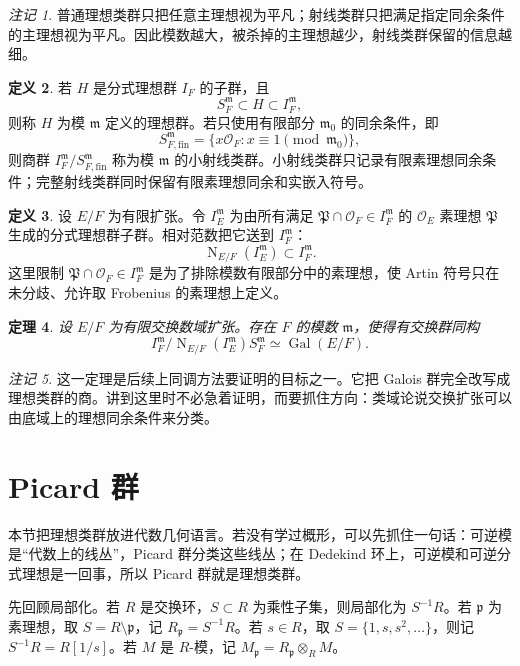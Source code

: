 \documentclass[11pt,a4paper,openany]{ctexbook}
\numberwithin{equation}{chapter}
\newcommand{\OF}{\mathcal{O}_F}
\newcommand{\Gal}{\operatorname{Gal}}
\newcommand{\Nm}{\operatorname{N}}
\theoremstyle{plain}
\newtheorem{theorem}{定理}[chapter]
\theoremstyle{definition}
\newtheorem{definition}[theorem]{定义}
\theoremstyle{remark}
\newtheorem{remark}[theorem]{注记}
\begin{document}
\begin{remark}
普通理想类群只把任意主理想视为平凡；射线类群只把满足指定同余条件的主理想视为平凡。因此模数越大，被杀掉的主理想越少，射线类群保留的信息越细。
\end{remark}

\begin{definition}
若 $H$ 是分式理想群 $I_F$ 的子群，且
\[
S_F^{\mathfrak m}\subset H\subset I_F^{\mathfrak m},
\]
则称 $H$ 为模 $\mathfrak m$ 定义的理想群。若只使用有限部分
$\mathfrak m_0$ 的同余条件，即
\[
S_{F,\mathrm{fin}}^{\mathfrak m}
=\{x\OF:x\equiv1\pmod{\mathfrak m_0}\},
\]
则商群 $I_F^{\mathfrak m}/S_{F,\mathrm{fin}}^{\mathfrak m}$ 称为模
$\mathfrak m$ 的小射线类群。小射线类群只记录有限素理想同余条件；完整射线类群同时保留有限素理想同余和实嵌入符号。
\end{definition}

\begin{definition}
设 $E/F$ 为有限扩张。令 $I_E^{\mathfrak m}$ 为由所有满足
$\mathfrak P\cap\OF\in I_F^{\mathfrak m}$ 的 $\mathcal O_E$ 素理想 $\mathfrak P$
生成的分式理想群子群。相对范数把它送到 $I_F^{\mathfrak m}$：
\[
\Nm_{E/F}(I_E^{\mathfrak m})\subset I_F^{\mathfrak m}.
\]
这里限制 $\mathfrak P\cap\OF\in I_F^{\mathfrak m}$ 是为了排除模数有限部分中的素理想，使 Artin 符号只在未分歧、允许取 Frobenius 的素理想上定义。
\end{definition}

\begin{theorem}
设 $E/F$ 为有限交换数域扩张。存在 $F$ 的模数 $\mathfrak m$，使得有交换群同构
\[
I_F^{\mathfrak m}/\Nm_{E/F}(I_E^{\mathfrak m})S_F^{\mathfrak m}
\simeq
\Gal(E/F).
\]
\end{theorem}

\begin{remark}
这一定理是后续上同调方法要证明的目标之一。它把 Galois 群完全改写成理想类群的商。讲到这里时不必急着证明，而要抓住方向：类域论说交换扩张可以由底域上的理想同余条件来分类。
\end{remark}

\section{Picard 群}

本节把理想类群放进代数几何语言。若没有学过概形，可以先抓住一句话：可逆模是“代数上的线丛”，Picard 群分类这些线丛；在 Dedekind 环上，可逆模和可逆分式理想是一回事，所以 Picard 群就是理想类群。

先回顾局部化。若 $R$ 是交换环，$S\subset R$ 为乘性子集，则局部化为
$S^{-1}R$。若 $\mathfrak p$ 为素理想，取 $S=R\setminus\mathfrak p$，记
$R_{\mathfrak p}=S^{-1}R$。若 $s\in R$，取
$S=\{1,s,s^2,\dots\}$，则记 $S^{-1}R=R[1/s]$。若 $M$ 是 $R$-模，记
$M_{\mathfrak p}=R_{\mathfrak p}\otimes_RM$。
\end{document}
